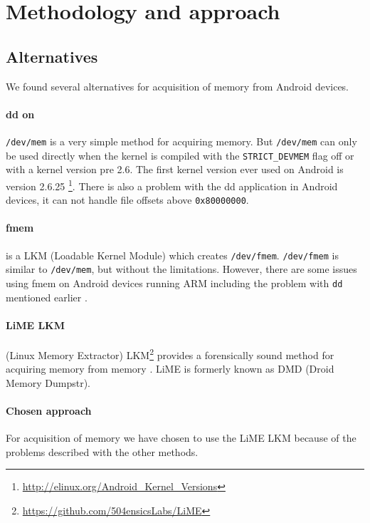 \section{Methodology and approach}
\subsection{Alternatives}\label{lime}
We found several alternatives for acquisition of memory from Android devices.
\paragraph{dd on} \texttt{/dev/mem} is a very simple method for acquiring memory. But \texttt{/dev/mem} 
can only be used directly when the kernel is compiled with the \texttt{STRICT\_DEVMEM} flag off or with 
a kernel version pre 2.6. The first kernel version ever used on Android is version 2.6.25
\footnote{\url{http://elinux.org/Android\_Kernel\_Versions}}. There is also a problem with the dd 
application in Android devices, it can not handle file offsets above \texttt{0x80000000}\cite{acq_vol_android_mem}.
\paragraph{fmem} is a LKM (Loadable Kernel Module) which creates \texttt{/dev/fmem}. \texttt{/dev/fmem} 
is similar to \texttt{/dev/mem}, but without the limitations. However, there are some issues using 
fmem on Android devices running ARM including the problem with \texttt{dd} mentioned earlier \cite{acq_vol_android_mem}.
\paragraph{LiME LKM} (Linux Memory Extractor) LKM\footnote{\url{https://github.com/504ensicsLabs/LiME}} 
provides a forensically sound method for acquiring memory from memory \cite{heriyanto2013procedures}. 
LiME is formerly known as DMD (Droid Memory Dumpstr).
\paragraph{Chosen approach} For acquisition of memory we have chosen to use the LiME LKM because of 
the problems described with the other methods.
